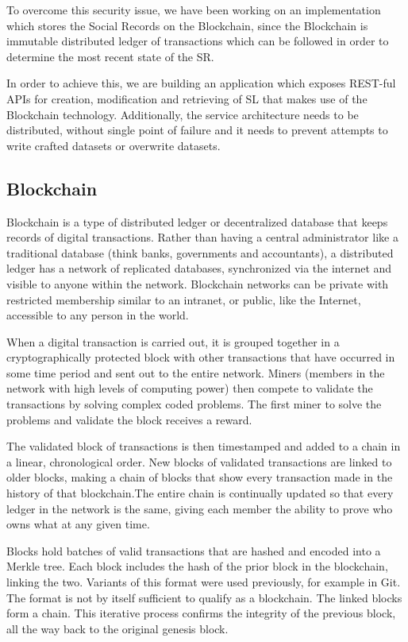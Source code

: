 To overcome this security issue, we have been working on an implementation which stores the Social Records on the Blockchain, since the Blockchain is immutable distributed ledger of transactions which can be followed in order to determine the most recent state of the SR.

In order to achieve this, we are building an application which exposes REST-ful APIs for creation, modification and retrieving of SL that makes use of the Blockchain technology. Additionally, the service architecture needs to be distributed, without single point of failure and it needs to prevent attempts to write crafted datasets or overwrite datasets.

\subsection{Blockchain}
Blockchain is a type of distributed ledger or decentralized database that keeps records of digital transactions. Rather than having a central administrator like a traditional database (think banks, governments and accountants), a distributed ledger has a network of replicated databases, synchronized via the internet and visible to anyone within the network. Blockchain networks can be private with restricted membership similar to an intranet, or public, like the Internet, accessible to any person in the world.

When a digital transaction is carried out, it is grouped together in a cryptographically protected block with other transactions that have occurred in some time period and sent out to the entire network. Miners (members in the network with high levels of computing power) then compete to validate the transactions by solving complex coded problems. The first miner to solve the problems and validate the block receives a reward.

The validated block of transactions is then timestamped and added to a chain in a linear, chronological order. New blocks of validated transactions are linked to older blocks, making a chain of blocks that show every transaction made in the history of that blockchain.The entire chain is continually updated so that every ledger in the network is the same, giving each member the ability to prove who owns what at any given time.

Blocks hold batches of valid transactions that are hashed and encoded into a Merkle tree. Each block includes the hash of the prior block in the blockchain, linking the two. Variants of this format were used previously, for example in Git. The format is not by itself sufficient to qualify as a blockchain. The linked blocks form a chain. This iterative process confirms the integrity of the previous block, all the way back to the original genesis block.

